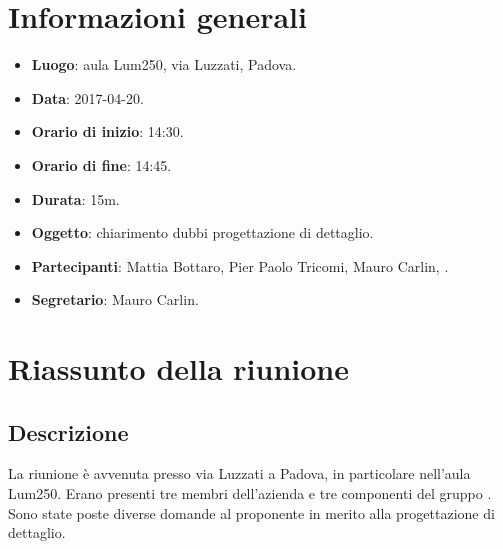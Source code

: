 \documentclass[a4paper,titlepage]{article}
\begin{document}
		
		\maketitle
		\begin{diario}
		\end{diario}
		\newpage
		\tableofcontents
		
		\newpage
		\section{Informazioni generali}
		\label{sec:Informazioni}
		
		\begin{itemize}
			\item \textbf{Luogo}: aula Lum250, via Luzzati, Padova.
			\item \textbf{Data}: 2017-04-20.
			\item \textbf{Orario di inizio}: 14:30.
			\item \textbf{Orario di fine}: 14:45.
			\item \textbf{Durata}: 15m.
			\item \textbf{Oggetto}: chiarimento dubbi progettazione di dettaglio.
			\item \textbf{Partecipanti}: Mattia Bottaro, Pier Paolo Tricomi, Mauro Carlin, \PROPONENTE.
			\item \textbf{Segretario}: Mauro Carlin.
			
		\end{itemize}
		\section{Riassunto della riunione}
		\label{sec:RiassuntoRiunione}
		\subsection{Descrizione}
		La riunione è avvenuta presso via Luzzati a Padova, in particolare nell'aula Lum250. Erano presenti tre membri dell'azienda  e tre componenti del gruppo \GRUPPO{}. Sono state poste diverse domande al proponente in merito alla progettazione di dettaglio.
\end{document}
